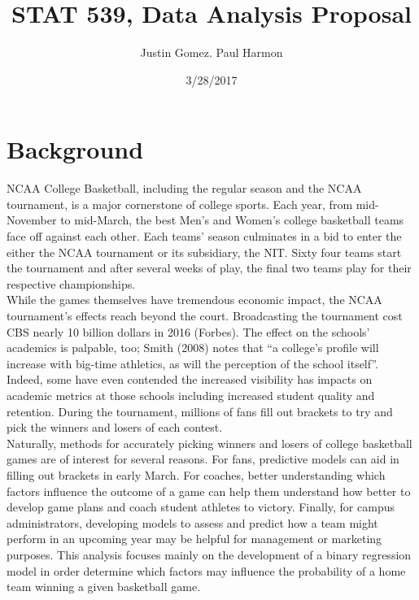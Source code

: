 \documentclass[12pt]{article}\usepackage[]{graphicx}\usepackage[]{color}
\begin{document}
\title{STAT 539, Data Analysis Proposal}
\author{Justin Gomez. Paul Harmon}
\date{3/28/2017}
\maketitle

\doublespacing

\section{Background}
NCAA College Basketball, including the regular season and the NCAA tournament, is a major cornerstone of college sports. Each year, from mid-November to mid-March, the best Men’s and Women’s college basketball teams face off against each other. Each teams’ season culminates in a bid to enter the either the NCAA tournament or its subsidiary, the NIT. Sixty four teams start the tournament and after several weeks of play, the final two teams play for their respective championships.\\

While the games themselves have tremendous economic impact, the NCAA tournament’s effects reach beyond the court. Broadcasting the tournament cost CBS nearly 10 billion dollars in 2016 (Forbes). The effect on the schools’ academics is palpable, too; Smith (2008) notes that “a college’s profile will increase with big-time athletics, as will the perception of the school itself”. Indeed, some have even contended the increased visibility has impacts on academic metrics at those schools including increased student quality and retention.  During the tournament, millions of fans fill out brackets to try and pick the winners and losers of each contest.\\

Naturally, methods for accurately picking winners and losers of college basketball games are of interest for several reasons. For fans, predictive models can aid in filling out brackets in early March. For coaches, better understanding which factors influence the outcome of a game can help them understand how better to develop game plans and coach student athletes to victory. Finally, for campus administrators, developing models to assess and predict how a team might perform in an upcoming year may be helpful for management or marketing purposes. This analysis focuses mainly on the development of a binary regression model in order determine which factors may influence the probability of a home team winning a given basketball game.\\
\end{document}
